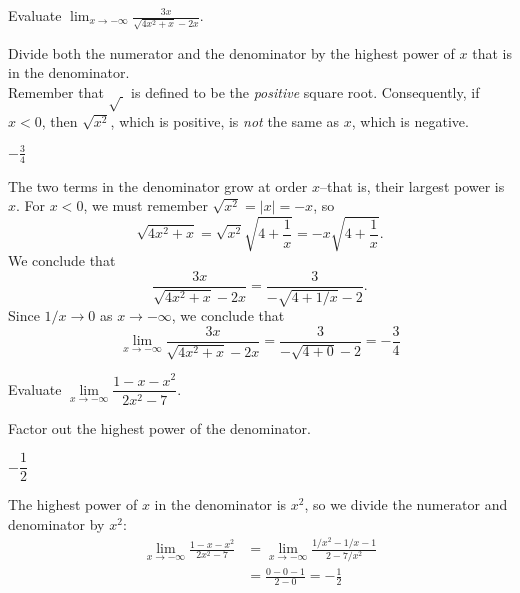 \begin{question}[2015Q]\label{s1.5first_neg_sqrt}
 Evaluate $\displaystyle \lim_{x\to -\infty} \frac{3x}{\sqrt{4x^2+x}-2x}$.
\end{question}
\begin{hint}
Divide both the numerator and the denominator by the highest
         power of $x$ that is in the denominator.\\
Remember that $\sqrt{\ }$ is defined to be the \emph{positive} square root.
          Consequently, if $x<0$, then $\sqrt{x^2}$, which
          is positive, is \emph{not} the same as $x$, which is negative.\end{hint}
\begin{answer}
$-\frac{3}{4}$
\end{answer}
\begin{solution}
The two terms in the denominator grow at order $x$--that is, their largest power is $x$.  For $x<0$, we must remember $\sqrt{x^2}=|x|=-x$, so
$$\sqrt{4x^2+x} = \sqrt{x^2}\sqrt{4+\frac{1}{x}} = -x \sqrt{4+\frac{1}{x}}.$$
We conclude that
$$\frac{3x}{\sqrt{4x^2+x}-2x} =  \frac{3}{-\sqrt{4+1/x}-2}.$$
Since $1/x\to 0$ as $x\to -\infty$, we conclude that
$$\lim_{x\to -\infty} \frac{3x}{\sqrt{4x^2+x}-2x} =
      \frac{3}{-\sqrt{4+0}-2} = -\frac{3}{4}$$
\end{solution}%


\begin{Mquestion}[2007H]
Evaluate $\lim\limits_{x\rightarrow -\infty}\dfrac{1-x-x^2}{2x^2-7}$.
\end{Mquestion}
\begin{hint}
Factor out the highest power of the denominator.
\end{hint}
\begin{answer}
$-\dfrac{1}{2}$
\end{answer}
\begin{solution}
The highest power of $x$ in the denominator is $x^2$, so we divide the numerator and denominator by $x^2$:
\begin{align*}
\lim\limits_{x\rightarrow -\infty}\frac{1-x-x^2}{2x^2-7}&=
\lim\limits_{x\rightarrow -\infty}\frac{1/x^2-1/x-1}{2-7/x^2}\\
&=\frac{0-0-1}{2-0}=-\frac{1}{2}
\end{align*}
\end{solution}







